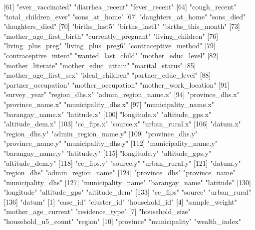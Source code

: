  [61] "ever_vaccinated"           "diarrhea_recent"           "fever_recent"             
 [64] "cough_recent"              "total_children_ever"       "sons_at_home"             
 [67] "daughters_at_home"         "sons_died"                 "daughters_died"           
 [70] "births_last5"              "births_last1"              "births_this_month"        
 [73] "mother_age_first_birth"    "currently_pregnant"        "living_children"          
 [76] "living_plus_preg"          "living_plus_preg6"         "contraceptive_method"     
 [79] "contraceptive_intent"      "wanted_last_child"         "mother_educ_level"        
 [82] "mother_literate"           "mother_educ_attain"        "marital_status"           
 [85] "mother_age_first_sex"      "ideal_children"            "partner_educ_level"       
 [88] "partner_occupation"        "mother_occupation"         "mother_work_location"     
 [91] "survey_year"               "region_dhs.x"              "admin_region_name.x"      
 [94] "province_dhs.x"            "province_name.x"           "municipality_dhs.x"       
 [97] "municipality_name.x"       "barangay_name.x"           "latitude.x"               
[100] "longitude.x"               "altitude_gps.x"            "altitude_dem.x"           
[103] "cc_fips.x"                 "source.x"                  "urban_rural.x"            
[106] "datum.x"                   "region_dhs.y"              "admin_region_name.y"      
[109] "province_dhs.y"            "province_name.y"           "municipality_dhs.y"       
[112] "municipality_name.y"       "barangay_name.y"           "latitude.y"               
[115] "longitude.y"               "altitude_gps.y"            "altitude_dem.y"           
[118] "cc_fips.y"                 "source.y"                  "urban_rural.y"            
[121] "datum.y"                   "region_dhs"                "admin_region_name"        
[124] "province_dhs"              "province_name"             "municipality_dhs"         
[127] "municipality_name"         "barangay_name"             "latitude"                 
[130] "longitude"                 "altitude_gps"              "altitude_dem"             
[133] "cc_fips"                   "source"                    "urban_rural"              
[136] "datum"                    
  [1] "case_id"                   "cluster_id"                "household_id"             
  [4] "sample_weight"             "mother_age_current"        "residence_type"           
  [7] "household_size"            "household_u5_count"        "region"                   
 [10] "province"                  "municipality"              "wealth_index"             
